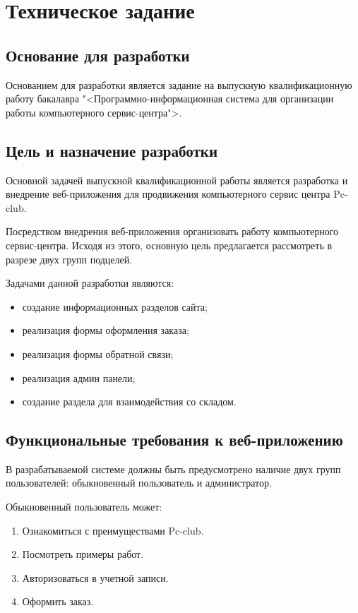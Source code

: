 \section{Техническое задание}
\subsection{Основание для разработки}

Основанием для разработки является задание на выпускную квалификационную работу бакалавра "<Программно-информационная система для  организации работы  компьютерного сервис-центра">.

\subsection{Цель и назначение разработки}

Основной задачей выпускной квалификационной работы является разработка и внедрение веб-приложения для продвижения компьютерного сервис центра Pc-club.

Посредством внедрения веб-приложения организовать работу компьютерного сервис-центра. Исходя из этого, основную цель предлагается рассмотреть в разрезе двух групп подцелей.

Задачами данной разработки являются:
\begin{itemize}
\item создание информационных разделов сайта;
\item реализация формы оформления заказа;
\item реализация формы обратной связи;
\item реализация админ панели;
\item создание раздела для взаимодействия со складом.
\end{itemize}

\subsection{ Функциональные требования к веб-приложению}

В разрабатываемой системе должны быть предусмотрено наличие двух групп пользователей: обыкновенный пользователь и администратор.

Обыкновенный пользователь может:
\begin{enumerate}
	\item Ознакомиться с преимуществами Pc-club.
	\item Посмотреть примеры работ.
	\item Авторизоваться в учетной записи.
	\item Оформить заказ.
\end{enumerate}

